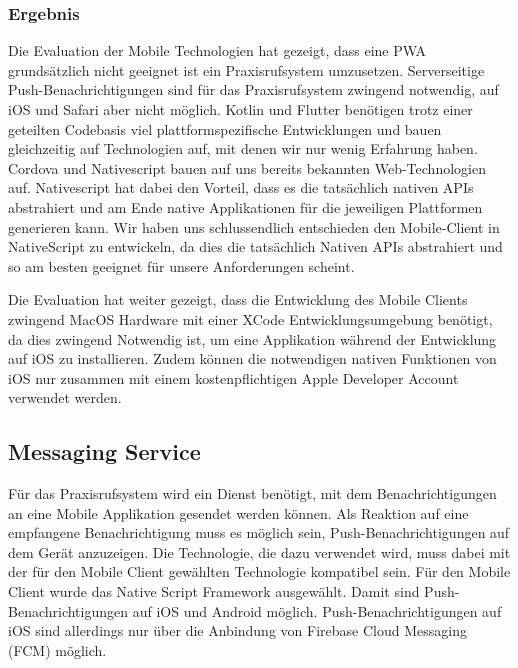 \subsubsection*{Ergebnis}

Die Evaluation der Mobile Technologien hat gezeigt, dass eine PWA grundsätzlich nicht geeignet ist ein Praxisrufsystem umzusetzen.
Serverseitige Push-Benachrichtigungen sind für das Praxisrufsystem zwingend notwendig, auf iOS und Safari aber nicht möglich.
Kotlin und Flutter benötigen trotz einer geteilten Codebasis viel plattformspezifische Entwicklungen und bauen gleichzeitig auf Technologien auf, mit denen wir nur wenig Erfahrung haben.
Cordova und Nativescript bauen auf uns bereits bekannten Web-Technologien auf.
Nativescript hat dabei den Vorteil, dass es die tatsächlich nativen APIs abstrahiert und am Ende native Applikationen für die jeweiligen Plattformen generieren kann.
Wir haben uns schlussendlich entschieden den Mobile-Client in NativeScript zu entwickeln, da dies die tatsächlich Nativen APIs abstrahiert und so am besten geeignet für unsere Anforderungen scheint.

Die Evaluation hat weiter gezeigt, dass die Entwicklung des Mobile Clients zwingend MacOS Hardware mit einer XCode Entwicklungsumgebung benötigt,
da dies zwingend Notwendig ist, um eine Applikation während der Entwicklung auf iOS zu installieren.\cite{ns-envSetup}
Zudem können die notwendigen nativen Funktionen von iOS nur zusammen mit einem kostenpflichtigen Apple Developer Account verwendet werden.\cite{apple-apn}

\subsection{Messaging Service}\label{subsec:messaging-eval}

Für das Praxisrufsystem wird ein Dienst benötigt, mit dem Benachrichtigungen an eine Mobile Applikation gesendet werden können.
Als Reaktion auf eine empfangene Benachrichtigung muss es möglich sein, Push-Benachrichtigungen auf dem Gerät anzuzeigen.
Die Technologie, die dazu verwendet wird, muss dabei mit der für den Mobile Client gewählten Technologie kompatibel sein.
Für den Mobile Client wurde das Native Script Framework ausgewählt.
Damit sind Push-Benachrichtigungen auf iOS und Android möglich.
Push-Benachrichtigungen auf iOS sind allerdings nur über die Anbindung von Firebase Cloud Messaging (FCM) möglich.\cite{nativescript-push}

